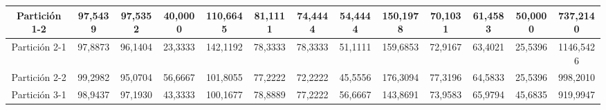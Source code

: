 \documentclass[12pt]{article}
\begin{document}
\begin{table}[H]
{\begin{tabular}{|c|cccc|cccc|cccc|}
Partición 1-2 & \multicolumn{1}{c|}{97,5439}                                                  & \multicolumn{1}{c|}{97,5352}                                                 & \multicolumn{1}{c|}{40,0000} & 110,6645 & \multicolumn{1}{c|}{81,1111}                                                  & \multicolumn{1}{c|}{74,4444}                                                 & \multicolumn{1}{c|}{54,4444} & 150,1978 & \multicolumn{1}{c|}{70,1031}                                                  & \multicolumn{1}{c|}{61,4583}                                                 & \multicolumn{1}{c|}{50,0000} & 737,2140  \\ \hline
Partición 2-1 & \multicolumn{1}{c|}{97,8873}                                                  & \multicolumn{1}{c|}{96,1404}                                                 & \multicolumn{1}{c|}{23,3333} & 142,1192 & \multicolumn{1}{c|}{78,3333}                                                  & \multicolumn{1}{c|}{78,3333}                                                 & \multicolumn{1}{c|}{51,1111} & 159,6853 & \multicolumn{1}{c|}{72,9167}                                                  & \multicolumn{1}{c|}{63,4021}                                                 & \multicolumn{1}{c|}{25,5396} & 1146,5426 \\ \hline
Partición 2-2 & \multicolumn{1}{c|}{99,2982}                                                  & \multicolumn{1}{c|}{95,0704}                                                 & \multicolumn{1}{c|}{56,6667} & 101,8055 & \multicolumn{1}{c|}{77,2222}                                                  & \multicolumn{1}{c|}{72,2222}                                                 & \multicolumn{1}{c|}{45,5556} & 176,3094 & \multicolumn{1}{c|}{77,3196}                                                  & \multicolumn{1}{c|}{64,5833}                                                 & \multicolumn{1}{c|}{25,5396} & 998,2010  \\ \hline
Partición 3-1 & \multicolumn{1}{c|}{98,9437}                                                  & \multicolumn{1}{c|}{97,1930}                                                 & \multicolumn{1}{c|}{43,3333} & 100,1677 & \multicolumn{1}{c|}{78,8889}                                                  & \multicolumn{1}{c|}{77,2222}                                                 & \multicolumn{1}{c|}{56,6667} & 143,8691 & \multicolumn{1}{c|}{73,9583}                                                  & \multicolumn{1}{c|}{65,9794}                                                 & \multicolumn{1}{c|}{45,6835} & 919,9947  \\ \hline

\end{tabular}}
\end{table}
\end{document}
